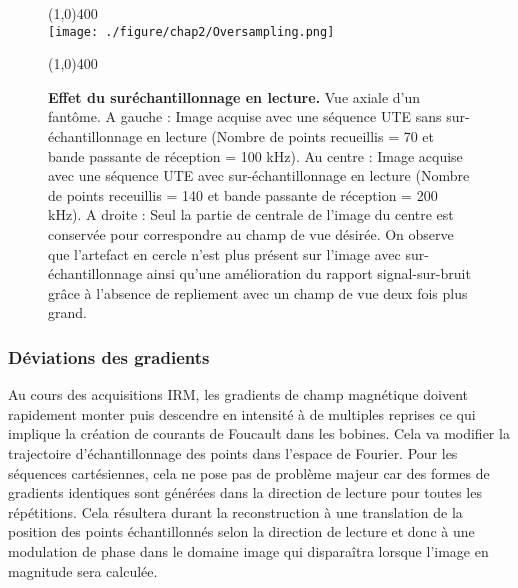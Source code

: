 \begin{figure}[H]
\centering
\line(1,0){400} \\
\texttt{[image: ./figure/chap2/Oversampling.png]}
\caption[Effet du suréchantillonnage en lecture.]{\label{fig:Oversampling} \textbf{Effet du suréchantillonnage en lecture.} Vue axiale d'un fantôme. A gauche : Image acquise avec une séquence UTE sans sur-échantillonnage en lecture (Nombre de points recueillis = 70 et bande passante de réception = 100 kHz). Au centre : Image acquise avec une séquence UTE avec sur-échantillonnage en lecture (Nombre de points receuillis = 140 et bande passante de réception = 200 kHz). A droite : Seul la partie de centrale de l'image du centre est conservée pour correspondre au champ de vue désirée. On observe que l'artefact en cercle n'est plus présent sur l'image avec sur-échantillonnage ainsi qu'une amélioration du rapport signal-sur-bruit grâce à l'absence de repliement avec un champ de vue deux fois plus grand.}
\line(1,0){400} \\
\end{figure}

\subsubsection{Déviations des gradients}

Au cours des acquisitions IRM, les gradients de champ magnétique doivent rapidement monter puis descendre en intensité à de multiples reprises ce qui implique la création de courants de Foucault dans les bobines. Cela va modifier la trajectoire d'échantillonnage des points dans l'espace de Fourier.
Pour les séquences cartésiennes, cela ne pose pas de problème majeur car des formes de gradients identiques sont générées dans la direction de lecture pour toutes les répétitions. Cela résultera durant la reconstruction à une translation de la position des points échantillonnés selon la direction de lecture et donc à une modulation de phase dans le domaine image qui disparaîtra lorsque l'image en magnitude sera calculée.

